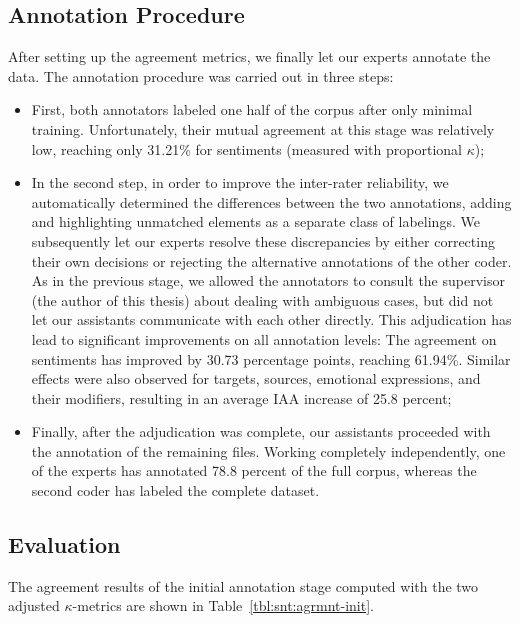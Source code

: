 \subsection{Annotation Procedure}\label{sec:astages}
After setting up the agreement metrics, we finally let our experts
annotate the data.  The annotation procedure was carried out in three
steps:
\begin{itemize}
  \item First, both annotators labeled one half of the corpus after
    only minimal training.  Unfortunately, their mutual agreement at
    this stage was relatively low, reaching only 31.21\% for
    sentiments (measured with proportional $\kappa$);
  \item In the second step, in order to improve the inter-rater
    reliability, we automatically determined the differences between
    the two annotations, adding and highlighting unmatched elements as
    a separate class of labelings. We subsequently let our experts
    resolve these discrepancies by either correcting their own
    decisions or rejecting the alternative annotations of the other
    coder.  As in the previous stage, we allowed the annotators to
    consult the supervisor (the author of this thesis) about dealing
    with ambiguous cases, but did not let our assistants communicate
    with each other directly.  This adjudication has lead to
    significant improvements on all annotation levels: The agreement
    on sentiments has improved by 30.73 percentage points, reaching
    61.94\%.  Similar effects were also observed for targets, sources,
    emotional expressions, and their modifiers, resulting in an
    average IAA increase of 25.8 percent;
  \item Finally, after the adjudication was complete, our assistants
    proceeded with the annotation of the remaining files.  Working
    completely independently, one of the experts has annotated 78.8
    percent of the full corpus, whereas the second coder has labeled
    the complete dataset.
\end{itemize}

\subsection{Evaluation}\label{sec:eval}
The agreement results of the initial annotation stage computed with
the two adjusted $\kappa$-metrics are shown in
Table~\ref{tbl:snt:agrmnt-init}.

